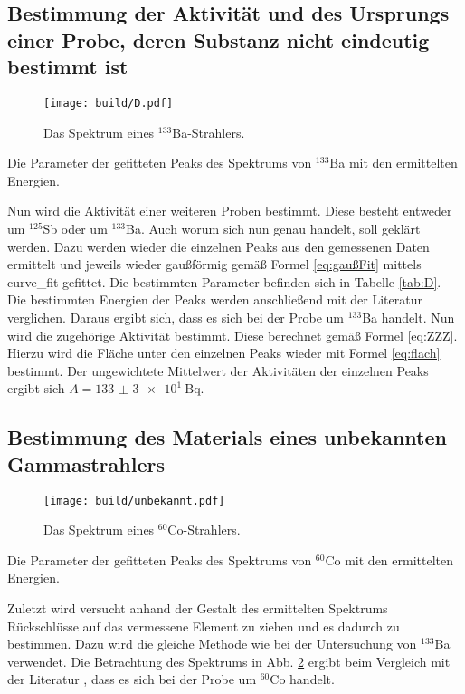 \subsection{Bestimmung der Aktivität und des Ursprungs einer Probe, deren Substanz nicht eindeutig bestimmt ist}
\begin{figure}
	\centering
	\texttt{[image: build/D.pdf]}
	\caption{Das Spektrum eines $^{133}$Ba-Strahlers.}
	\label{fig:3}
\end{figure}
\begin{table}
	\centering
	\caption{Die Parameter der gefitteten Peaks des Spektrums von $^{133}$Ba mit den ermittelten Energien.}
	
\end{table}
Nun wird die Aktivität einer weiteren Proben bestimmt. Diese besteht entweder um $^{125}$Sb oder um $^{133}$Ba. Auch worum sich nun genau handelt, soll geklärt werden. Dazu werden wieder die einzelnen Peaks aus den gemessenen Daten ermittelt und jeweils wieder gaußförmig gemäß Formel \eqref{eq:gaußFit} mittels curve\_fit \cite{scipy} gefittet. Die bestimmten Parameter befinden sich in Tabelle \ref{tab:D}. Die bestimmten Energien der Peaks werden anschließend mit der Literatur \cite{V18} verglichen. Daraus ergibt sich, dass es sich bei der Probe um $^{133}$Ba handelt. Nun wird die zugehörige Aktivität bestimmt. Diese berechnet gemäß Formel \eqref{eq:ZZZ}. Hierzu wird die Fläche unter den einzelnen Peaks wieder mit Formel \eqref{eq:flach} bestimmt. Der ungewichtete Mittelwert der Aktivitäten der einzelnen Peaks ergibt sich $A = \SI{133(3)e1}{\becquerel}$.


\subsection{Bestimmung des Materials eines unbekannten Gammastrahlers}
\begin{figure}
	\centering
	\texttt{[image: build/unbekannt.pdf]}
	\caption{Das Spektrum eines $^{60}$Co-Strahlers.}
	\label{fig:4}
\end{figure}
\begin{table}
	\centering
	\caption{Die Parameter der gefitteten Peaks des Spektrums von $^{60}$Co mit den ermittelten Energien.}
	
\end{table}
Zuletzt wird versucht anhand der Gestalt des ermittelten Spektrums Rückschlüsse auf das vermessene Element zu ziehen und es dadurch zu bestimmen. Dazu wird die gleiche Methode wie bei der Untersuchung von $^{133}$Ba verwendet. Die Betrachtung des Spektrums in Abb. \ref{fig:4} ergibt beim Vergleich mit der Literatur \cite{BROWNE20131849}, dass es sich bei der Probe um $^{60}$Co handelt.%